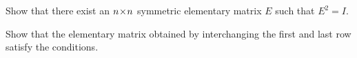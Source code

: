 
\begin{Exercise}[
name={},
title={}, 
difficulty=0,
origin={\cite{YL}}]
Show that there exist an $n \! \times \! n$ symmetric elementary matrix $E$ such that $E^2=I$.
\end{Exercise}

\begin{Answer}
Show that the elementary matrix obtained by interchanging the first and last row satisfy the conditions.
\end{Answer}
